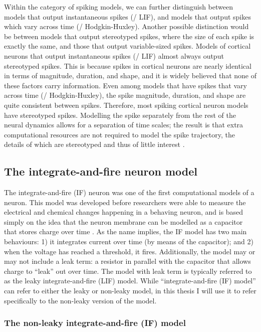 Within the category of spiking models,
we can further distinguish between
models that output instantaneous spikes (\eg/ LIF),
and models that output spikes which vary across time (\eg/ Hodgkin-Huxley).
Another possible distinction would be between models
that output stereotyped spikes,
where the size of each spike is exactly the same,
and those that output variable-sized spikes.
Models of cortical neurons that output instantaneous spikes (\eg/ LIF)
almost always output stereotyped spikes.
This is because spikes in cortical neurons are nearly identical
in terms of magnitude, duration, and shape,
and it is widely believed that none of these factors carry information.
Even among models that have spikes that vary across time (\eg/ Hodgkin-Huxley),
the spike magnitude, duration, and shape are quite consistent between spikes.
Therefore, most spiking cortical neuron models have stereotyped spikes.
Modelling the spike separately from the rest of the neural dynamics
allows for a separation of time scales;
the result is that extra computational resources are not required
to model the spike trajectory,
the details of which are stereotyped and thus of little interest \parencite{Abbott1999}.


\subsection{The integrate-and-fire neuron model}

The integrate-and-fire (IF) neuron \parencite{Lapicque1907}
was one of the first computational models of a neuron.
This model was developed before researchers were able to measure
the electrical and chemical changes happening in a behaving neuron,
and is based simply on the idea that the neuron membrane
can be modelled as a capacitor that stores charge over time \parencite{Abbott1999}.
As the name implies, the IF model has two main behaviours:
1) it integrates current over time (by means of the capacitor);
and 2) when the voltage has reached a threshold, it fires.
Additionally, the model may or may not include a leak term:
a resistor in parallel with the capacitor that allows charge
to ``leak'' out over time.
The model with leak term is typically referred to
as the leaky integrate-and-fire (LIF) model.
While ``integrate-and-fire (IF) model'' can refer to either the leaky or non-leaky model,
in this thesis I will use it to refer specifically
to the non-leaky version of the model.


\subsubsection{The non-leaky integrate-and-fire (IF) model}

